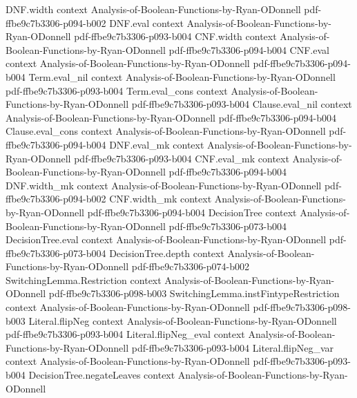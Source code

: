 \begin{theorem}
\proofstep
  {DNF.width}
  {context}
  {Analysis-of-Boolean-Functions-by-Ryan-ODonnell}
  {pdf-ffbe9c7b3306-p094-b002}
\proofstep
  {DNF.eval}
  {context}
  {Analysis-of-Boolean-Functions-by-Ryan-ODonnell}
  {pdf-ffbe9c7b3306-p093-b004}
\proofstep
  {CNF.width}
  {context}
  {Analysis-of-Boolean-Functions-by-Ryan-ODonnell}
  {pdf-ffbe9c7b3306-p094-b004}
\proofstep
  {CNF.eval}
  {context}
  {Analysis-of-Boolean-Functions-by-Ryan-ODonnell}
  {pdf-ffbe9c7b3306-p094-b004}
\proofstep
  {Term.eval_nil}
  {context}
  {Analysis-of-Boolean-Functions-by-Ryan-ODonnell}
  {pdf-ffbe9c7b3306-p093-b004}
\proofstep
  {Term.eval_cons}
  {context}
  {Analysis-of-Boolean-Functions-by-Ryan-ODonnell}
  {pdf-ffbe9c7b3306-p093-b004}
\proofstep
  {Clause.eval_nil}
  {context}
  {Analysis-of-Boolean-Functions-by-Ryan-ODonnell}
  {pdf-ffbe9c7b3306-p094-b004}
\proofstep
  {Clause.eval_cons}
  {context}
  {Analysis-of-Boolean-Functions-by-Ryan-ODonnell}
  {pdf-ffbe9c7b3306-p094-b004}
\proofstep
  {DNF.eval_mk}
  {context}
  {Analysis-of-Boolean-Functions-by-Ryan-ODonnell}
  {pdf-ffbe9c7b3306-p093-b004}
\proofstep
  {CNF.eval_mk}
  {context}
  {Analysis-of-Boolean-Functions-by-Ryan-ODonnell}
  {pdf-ffbe9c7b3306-p094-b004}
\proofstep
  {DNF.width_mk}
  {context}
  {Analysis-of-Boolean-Functions-by-Ryan-ODonnell}
  {pdf-ffbe9c7b3306-p094-b002}
\proofstep
  {CNF.width_mk}
  {context}
  {Analysis-of-Boolean-Functions-by-Ryan-ODonnell}
  {pdf-ffbe9c7b3306-p094-b004}
\proofstep
  {DecisionTree}
  {context}
  {Analysis-of-Boolean-Functions-by-Ryan-ODonnell}
  {pdf-ffbe9c7b3306-p073-b004}
\proofstep
  {DecisionTree.eval}
  {context}
  {Analysis-of-Boolean-Functions-by-Ryan-ODonnell}
  {pdf-ffbe9c7b3306-p073-b004}
\proofstep
  {DecisionTree.depth}
  {context}
  {Analysis-of-Boolean-Functions-by-Ryan-ODonnell}
  {pdf-ffbe9c7b3306-p074-b002}
\proofstep
  {SwitchingLemma.Restriction}
  {context}
  {Analysis-of-Boolean-Functions-by-Ryan-ODonnell}
  {pdf-ffbe9c7b3306-p098-b003}
\proofstep
  {SwitchingLemma.instFintypeRestriction}
  {context}
  {Analysis-of-Boolean-Functions-by-Ryan-ODonnell}
  {pdf-ffbe9c7b3306-p098-b003}
\proofstep
  {Literal.flipNeg}
  {context}
  {Analysis-of-Boolean-Functions-by-Ryan-ODonnell}
  {pdf-ffbe9c7b3306-p093-b004}
\proofstep
  {Literal.flipNeg_eval}
  {context}
  {Analysis-of-Boolean-Functions-by-Ryan-ODonnell}
  {pdf-ffbe9c7b3306-p093-b004}
\proofstep
  {Literal.flipNeg_var}
  {context}
  {Analysis-of-Boolean-Functions-by-Ryan-ODonnell}
  {pdf-ffbe9c7b3306-p093-b004}
\proofstep
  {DecisionTree.negateLeaves}
  {context}
  {Analysis-of-Boolean-Functions-by-Ryan-ODonnell}

\end{theorem}
